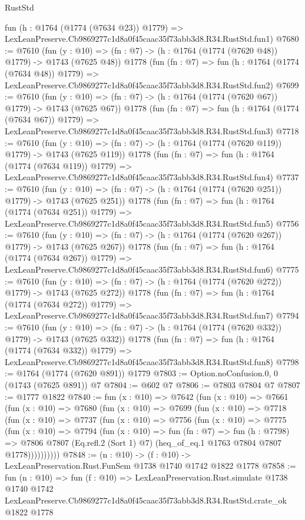 \begin{lexlean}{RustStd}
\begin{coremodule}
    fun (h : @1764 (@1774 (@7634 @23)) @1779) =>
    LexLeanPreserve.Cb9869277c1d8a0f45caac35f73abb3d8.R34.RustStd.fun1)
@7680 := @7610
    (fun (y : @10) => (fn : @7) -> (h : @1764 (@1774 (@7620 @48)) @1779) -> @1743 (@7625 @48))
    @1778
    (fun (fn : @7) =>
    fun (h : @1764 (@1774 (@7634 @48)) @1779) =>
    LexLeanPreserve.Cb9869277c1d8a0f45caac35f73abb3d8.R34.RustStd.fun2)
@7699 := @7610
    (fun (y : @10) => (fn : @7) -> (h : @1764 (@1774 (@7620 @67)) @1779) -> @1743 (@7625 @67))
    @1778
    (fun (fn : @7) =>
    fun (h : @1764 (@1774 (@7634 @67)) @1779) =>
    LexLeanPreserve.Cb9869277c1d8a0f45caac35f73abb3d8.R34.RustStd.fun3)
@7718 := @7610
    (fun (y : @10) => (fn : @7) -> (h : @1764 (@1774 (@7620 @119)) @1779) -> @1743 (@7625 @119))
    @1778
    (fun (fn : @7) =>
    fun (h : @1764 (@1774 (@7634 @119)) @1779) =>
    LexLeanPreserve.Cb9869277c1d8a0f45caac35f73abb3d8.R34.RustStd.fun4)
@7737 := @7610
    (fun (y : @10) => (fn : @7) -> (h : @1764 (@1774 (@7620 @251)) @1779) -> @1743 (@7625 @251))
    @1778
    (fun (fn : @7) =>
    fun (h : @1764 (@1774 (@7634 @251)) @1779) =>
    LexLeanPreserve.Cb9869277c1d8a0f45caac35f73abb3d8.R34.RustStd.fun5)
@7756 := @7610
    (fun (y : @10) => (fn : @7) -> (h : @1764 (@1774 (@7620 @267)) @1779) -> @1743 (@7625 @267))
    @1778
    (fun (fn : @7) =>
    fun (h : @1764 (@1774 (@7634 @267)) @1779) =>
    LexLeanPreserve.Cb9869277c1d8a0f45caac35f73abb3d8.R34.RustStd.fun6)
@7775 := @7610
    (fun (y : @10) => (fn : @7) -> (h : @1764 (@1774 (@7620 @272)) @1779) -> @1743 (@7625 @272))
    @1778
    (fun (fn : @7) =>
    fun (h : @1764 (@1774 (@7634 @272)) @1779) =>
    LexLeanPreserve.Cb9869277c1d8a0f45caac35f73abb3d8.R34.RustStd.fun7)
@7794 := @7610
    (fun (y : @10) => (fn : @7) -> (h : @1764 (@1774 (@7620 @332)) @1779) -> @1743 (@7625 @332))
    @1778
    (fun (fn : @7) =>
    fun (h : @1764 (@1774 (@7634 @332)) @1779) =>
    LexLeanPreserve.Cb9869277c1d8a0f45caac35f73abb3d8.R34.RustStd.fun8)
@7798 := @1764 (@1774 (@7620 @891)) @1779
@7803 := Option.noConfusion.{0, 0} (@1743 (@7625 @891)) @7
@7804 := @602 @7
@7806 := @7803 @7804 @7
@7807 := @1777 @1822
@7840 := fun (x : @10) =>
  @7642
    (fun (x : @10) =>
    @7661
      (fun (x : @10) =>
      @7680
        (fun (x : @10) =>
        @7699
          (fun (x : @10) =>
          @7718
            (fun (x : @10) =>
            @7737
              (fun (x : @10) =>
              @7756
                (fun (x : @10) =>
                @7775
                  (fun (x : @10) =>
                  @7794
                    (fun (x : @10) =>
                    fun (fn : @7) =>
                    fun (h : @7798) =>
                    @7806
                      @7807
                      (Eq.refl.{2} (Sort 1) @7)
                      (heq_of_eq.{1} @1763 @7804 @7807 @1778))))))))))
@7848 := (n : @10) -> (f : @10) -> LexLeanPreservation.Rust.FunSem @1738 @1740 @1742 @1822 @1778
@7858 := fun (n : @10) =>
  fun (f : @10) =>
  LexLeanPreservation.Rust.simulate
    @1738
    @1740
    @1742
    LexLeanPreserve.Cb9869277c1d8a0f45caac35f73abb3d8.R34.RustStd.crate_ok
    @1822
    @1778
\end{coremodule}
\end{lexlean}
